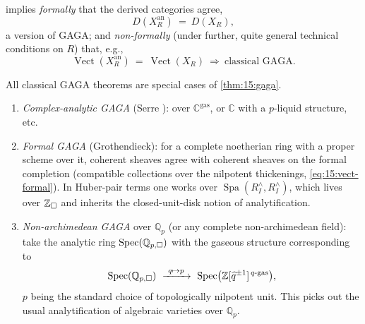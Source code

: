 \begin{remark}
\label{rmk:15:gaga-consequences}
 implies \emph{formally} that the derived categories agree,
\begin{equation*}
D(X_R^{\mathrm{an}})\ =\ D(X_R),
\end{equation*}
a version of GAGA; and \emph{non-formally} (under further, quite general technical
conditions on $R$) that, e.g.,
\begin{equation*}
\operatorname{Vect}(X_R^{\mathrm{an}})\ =\ \operatorname{Vect}(X_R)
\ \Longrightarrow\ \text{classical GAGA.}
\end{equation*}
\end{remark}

\begin{remark}
\label{rmk:15:gaga-special}
All classical GAGA theorems are special cases of \cref{thm:15:gaga}.
\begin{enumerate}
\item \emph{Complex-analytic GAGA} (Serre \cite{Serre_1956}): over
$\mathbb{C}^{\mathrm{gas}}$, or $\mathbb{C}$ with a $p$-liquid structure, etc.
\item \emph{Formal GAGA} (Grothendieck): for a complete noetherian ring with a proper
scheme over it, coherent sheaves agree with coherent sheaves on the formal completion
(compatible collections over the nilpotent thickenings, \eqref{eq:15:vect-formal}).
In Huber-pair terms one works over $\operatorname{Spa}(R^{\wedge}_I, R^{\wedge}_I)$,
which lives over $\mathbb{Z}_{\square}$ and inherits the closed-unit-disk notion of
analytification.
\item \emph{Non-archimedean GAGA} over $\mathbb{Q}_p$ (or any complete
non-archimedean field): take the analytic ring $\operatorname{Spec}(\mathbb{Q}_{p,\square})$
with the gaseous structure corresponding to
\begin{equation}
\label{eq:15:nonarch-gaga}
\operatorname{Spec}(\mathbb{Q}_{p,\solid})\ \xrightarrow{\ q\mapsto p\ }\
\operatorname{Spec}\bigl(\mathbb{Z}[\widehat q^{\pm1}]^{\,q\text{-}\mathrm{gas}}\bigr),
\end{equation}
$p$ being the standard choice of topologically nilpotent unit. This picks out the
usual analytification of algebraic varieties over $\mathbb{Q}_p$.
\end{enumerate}
\end{remark}

